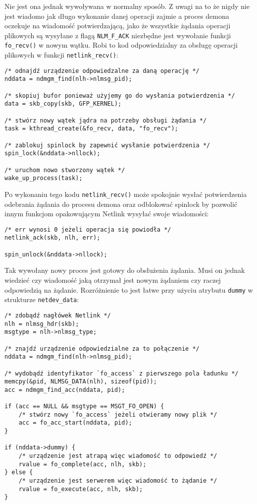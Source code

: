 \documentclass[10pt]{scrartcl}
\begin{document}
Nie jest ona jednak wywoływana w normalny sposób. Z uwagi na to że nigdy nie jest wiadomo jak długo wykonanie danej operacji zajmie a proces demona oczekuje na wiadomość potwierdzającą, jako że wszystkie żądania operacji plikowych są wysyłane z flagą \texttt{NLM\_F\_ACK} niezbędne jest wywołanie funkcji \texttt{fo\_recv()} w nowym wątku. Robi to kod odpowiedzialny za obsługę operacji plikowych w funkcji \texttt{netlink\_recv()}:

\begin{verbatim}
/* odnajdź urządzenie odpowiedzalne za daną operację */
nddata = ndmgm_find(nlh->nlmsg_pid);

/* skopiuj bufor ponieważ użyjemy go do wysłania potwierdzenia */
data = skb_copy(skb, GFP_KERNEL);

/* stwórz nowy wątek jądra na potrzeby obsługi żądania */
task = kthread_create(&fo_recv, data, "fo_recv");

/* zablokuj spinlock by zapewnić wysłanie potwierdzenia */
spin_lock(&nddata->nllock);

/* uruchom nowo stworzony wątek */
wake_up_process(task);
\end{verbatim}

Po wykonaniu tego kodu \texttt{netlink\_recv()} może spokojnie wysłać potwierdzenia odebrania żądania do procesu demona oraz odblokować spinlock by pozwolić innym funkcjom opakowującym Netlink wysyłać swoje wiadomości:

\begin{verbatim}
/* err wynosi 0 jeżeli operacja się powiodła */
netlink_ack(skb, nlh, err);

spin_unlock(&nddata->nllock);
\end{verbatim}

Tak wywołany nowy proces jest gotowy do obsłużenia żądania. Musi on jednak wiedzieć czy wiadomość jaką otrzymał jest nowym żądaniem czy raczej odpowiedzią na żądanie. Rozróżnienie to jest łatwe przy użyciu atrybutu \texttt{dummy} w strukturze \texttt{netdev\_data}:

\begin{verbatim}
/* zdobądź nagłówek Netlink */
nlh = nlmsg_hdr(skb);
msgtype = nlh->nlmsg_type;

/* znajdź urządzenie odpowiedzialne za to połączenie */
nddata = ndmgm_find(nlh->nlmsg_pid);

/* wydobądź identyfikator `fo_access` z pierwszego pola ładunku */
memcpy(&pid, NLMSG_DATA(nlh), sizeof(pid));
acc = ndmgm_find_acc(nddata, pid);

if (acc == NULL && msgtype == MSGT_FO_OPEN) {
    /* stwórz nowy `fo_access` jeżeli otwieramy nowy plik */
    acc = fo_acc_start(nddata, pid);
}

if (nddata->dummy) {
    /* urządzenie jest atrapą więc wiadomość to odpowiedź */
    rvalue = fo_complete(acc, nlh, skb);
} else {
    /* urządzenie jest serwerem więc wiadomość to żądanie */
    rvalue = fo_execute(acc, nlh, skb);
}
\end{verbatim}
\end{document}
